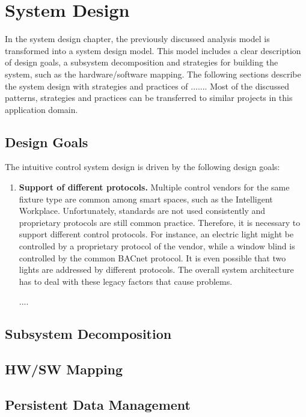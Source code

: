 
\chapter{System Design}
	In the system design chapter, the previously discussed analysis model is transformed into a system design model. This model includes a clear description of design goals, a subsystem decomposition and strategies for building the system, such as the hardware/software mapping. \cite{Bruegge2004} The following sections describe the system design with strategies and practices of .......   Most of the discussed patterns, strategies and practices can be transferred to similar projects in this application domain.

	\section{Design Goals}
	The intuitive control system design is driven by the following design goals:
	\begin{enumerate}
	\item \textbf{Support of different protocols.} Multiple control vendors for the same fixture type are common among smart spaces, such as the  Intelligent Workplace. Unfortunately, standards are not used consistently and proprietary protocols are still common practice. Therefore, it is necessary to support different control protocols. For instance, an electric light might be controlled by a proprietary protocol of the vendor, while a window blind is controlled by the common BACnet protocol. It is even possible that two lights are addressed by different protocols. The overall system architecture has to deal with these legacy factors that cause problems.
	
	....

	\end{enumerate}
		
	\section{Subsystem Decomposition}


	\section{HW/SW Mapping}

	\section{Persistent Data Management}
	
